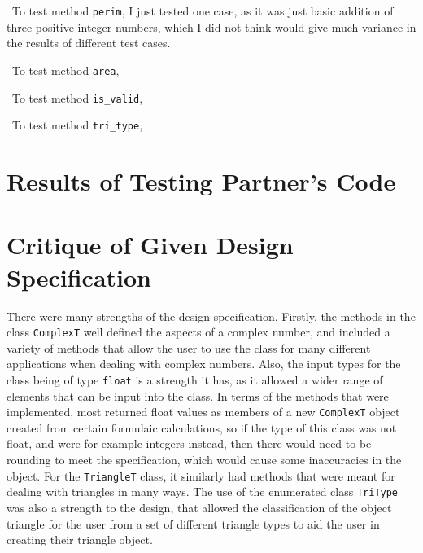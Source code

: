 \documentclass[12pt]{article}
\begin{document}
~\newline\noindent To test method \verb|perim|, I just tested one case, as it 
was just basic addition of three positive integer numbers, which I did not think 
would give much variance in the results of different test cases. 

~\newline\noindent To test method \verb|area|,

~\newline\noindent To test method \verb|is_valid|,

~\newline\noindent To test method \verb|tri_type|,



\section{Results of Testing Partner's Code}






\section{Critique of Given Design Specification}

There were many strengths of the design specification. Firstly, the methods in the class \verb|ComplexT| well defined the aspects of a complex number, and included a variety of methods that allow the user to use the class for many different applications when dealing with complex numbers. Also, the input types for the class being of type \verb|float| is a strength it has, as it allowed a wider range of elements that can be input into the class. In terms of the methods that were implemented, most returned float values as members of a new \verb|ComplexT| object created from certain formulaic calculations, so if the type of this class was not float, and were for example integers instead, then there would need to be rounding to meet the specification, which would cause some inaccuracies in the object. For the \verb|TriangleT| class, it similarly had methods that were meant for dealing with triangles in many ways. The use of the enumerated class \verb|TriType| was also a strength to the design, that allowed the classification of the object triangle for the user from a set of different triangle types to aid the user in creating their triangle object. 
\end{document}
